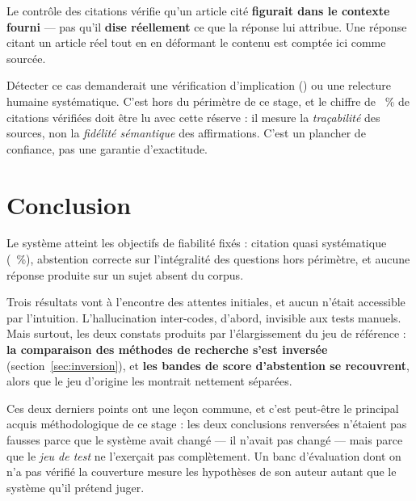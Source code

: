 Le contrôle des citations vérifie qu'un article cité \textbf{figurait dans le contexte fourni} ---
pas qu'il \textbf{dise réellement} ce que la réponse lui attribue. Une réponse citant un article
réel tout en en déformant le contenu est comptée ici comme sourcée.

Détecter ce cas demanderait une vérification d'implication () ou une relecture
humaine systématique. C'est hors du périmètre de ce stage, et le chiffre de \TauxVerif~\% de
citations vérifiées doit être lu avec cette réserve : il mesure la \emph{traçabilité} des sources,
non la \emph{fidélité sémantique} des affirmations. C'est un plancher de confiance, pas une
garantie d'exactitude.

\section*{Conclusion}

Le système atteint les objectifs de fiabilité fixés : citation quasi systématique
(\TauxCitation~\%), abstention correcte sur l'intégralité des questions hors périmètre, et aucune
réponse produite sur un sujet absent du corpus.

Trois résultats vont à l'encontre des attentes initiales, et aucun n'était accessible par
l'intuition. L'hallucination inter-codes, d'abord, invisible aux tests manuels. Mais surtout, les
deux constats produits par l'élargissement du jeu de référence : \textbf{la comparaison des
méthodes de recherche s'est inversée} (section~\ref{sec:inversion}), et \textbf{les bandes de score
d'abstention se recouvrent}, alors que le jeu d'origine les montrait nettement séparées.

Ces deux derniers points ont une leçon commune, et c'est peut-être le principal acquis
méthodologique de ce stage : les deux conclusions renversées n'étaient pas fausses parce que le
système avait changé --- il n'avait pas changé --- mais parce que le \emph{jeu de test} ne
l'exerçait pas complètement. Un banc d'évaluation dont on n'a pas vérifié la couverture mesure les
hypothèses de son auteur autant que le système qu'il prétend juger.
